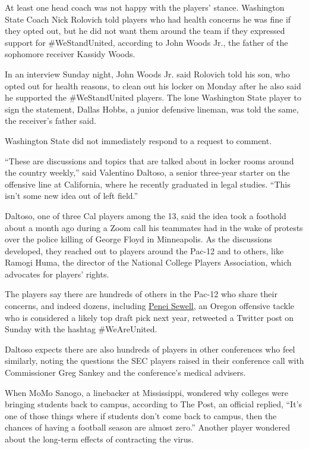 At least one head coach was not happy with the players' stance.
Washington State Coach Nick Rolovich told players who had health
concerns he was fine if they opted out, but he did not want them around
the team if they expressed support for \#WeStandUnited, according to
John Woods Jr., the father of the sophomore receiver Kassidy Woods.

In an interview Sunday night, John Woods Jr. said Rolovich told his son,
who opted out for health reasons, to clean out his locker on Monday
after he also said he supported the \#WeStandUnited players. The lone
Washington State player to sign the statement, Dallas Hobbs, a junior
defensive lineman, was told the same, the receiver's father said.

Washington State did not immediately respond to a request to comment.

``These are discussions and topics that are talked about in locker rooms
around the country weekly,'' said Valentino Daltoso, a senior three-year
starter on the offensive line at California, where he recently graduated
in legal studies. ``This isn't some new idea out of left field.''

Daltoso, one of three Cal players among the 13, said the idea took a
foothold about a month ago during a Zoom call his teammates had in the
wake of protests over the police killing of George Floyd in Minneapolis.
As the discussions developed, they reached out to players around the
Pac-12 and to others, like Ramogi Huma, the director of the National
College Players Association, which advocates for players' rights.

The players say there are hundreds of others in the Pac-12 who share
their concerns, and indeed dozens, including
\href{https://twitter.com/peneisewell58/status/1289974930155569153}{Penei
Sewell}, an Oregon offensive tackle who is considered a likely top draft
pick next year, retweeted a Twitter post on Sunday with the hashtag
\#WeAreUnited.

Daltoso expects there are also hundreds of players in other conferences
who feel similarly, noting the questions the SEC players raised in their
conference call with Commissioner Greg Sankey and the conference's
medical advisers.

When MoMo Sanogo, a linebacker at Mississippi, wondered why colleges
were bringing students back to campus, according to The Post, an
official replied, ``It's one of those things where if students don't
come back to campus, then the chances of having a football season are
almost zero.'' Another player wondered about the long-term effects of
contracting the virus.

